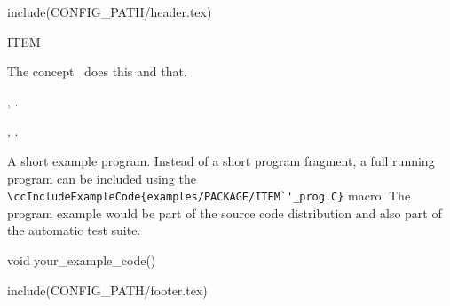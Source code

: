include(CONFIG_PATH/header.tex)
\begin{ccRefConcept}{ITEM}


\ccDefinition
  
The concept \ccRefName\ does this and that.

\ccTypes


\ccCreation
{}  %


\ccOperations


\ccHasModels

,
.

\ccSeeAlso

,
.

\ccExample

A short example program.
Instead of a short program fragment, a full running program can be
included using the 
\verb|\ccIncludeExampleCode{examples/PACKAGE/ITEM`'_prog.C}| 
macro. The program example would be part of the source code distribution and
also part of the automatic test suite.

\begin{ccExampleCode}
void your_example_code() {
}
\end{ccExampleCode}


\end{ccRefConcept}

include(CONFIG_PATH/footer.tex)
